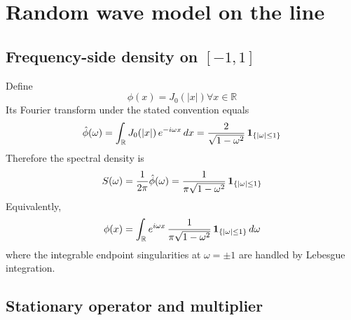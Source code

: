 \documentclass{article}
\newcommand{\tmtextbf}[1]{\text{{\bfseries{#1}}}}
\begin{document}
\section{Random wave model on the line}

\subsection{Frequency-side density on $[- 1, 1]$}

Define
\begin{equation}
  \phi (x) = J_0 (|x|) \forall x \in \mathbb{R}
\end{equation}
Its Fourier transform under the stated convention equals
\begin{equation}
  \hat{\phi} (\omega) = \int_{\mathbb{R}} J_0 (|x|)  \hspace{0.17em} e^{- i
  \omega x}  \hspace{0.17em} dx = \frac{2}{\sqrt{1 - \omega^2}}
  \hspace{0.17em} \text{\tmtextbf{1}}_{\{| \omega | \le 1\}}
\end{equation}
Therefore the spectral density is
\begin{equation}
  S (\omega) = \frac{1}{2 \pi}  \hat{\phi} (\omega) = \frac{1}{\pi \sqrt{1 -
  \omega^2}} \hspace{0.17em} \text{\tmtextbf{1}}_{\{| \omega | \le 1\}}
\end{equation}
Equivalently,
\begin{equation}
  \phi (x) = \int_{\mathbb{R}} e^{i \omega x}  \hspace{0.17em} \frac{1}{\pi
  \sqrt{1 - \omega^2}}  \hspace{0.17em} \text{\tmtextbf{1}}_{\{| \omega | \le
  1\}} \hspace{0.17em} d \omega
\end{equation}
where the integrable endpoint singularities at $\omega = \pm 1$ are handled by
Lebesgue integration.

\subsection{Stationary operator and multiplier}
\end{document}
